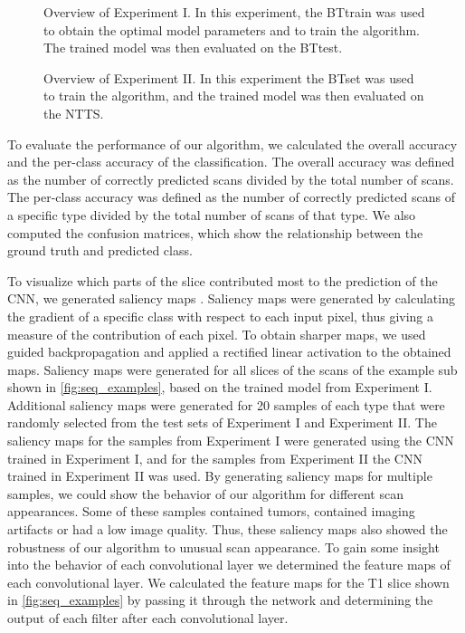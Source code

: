 \newpage
\begin{figure}
\centering
{}
\caption{Overview of Experiment I. In this experiment, the \gls{BTtrain} was used to obtain the optimal model parameters and to train the algorithm. The trained model was then evaluated on the \gls{BTtest}.}
\label{fig:brain_tumor_experiment}
\end{figure}

\begin{figure}
\centering


\caption{Overview of Experiment II. In this experiment the \gls{BTset} was used to train the algorithm, and the trained model was then evaluated on the \gls{NTTS}.}
\label{fig:adni_experiment}
\end{figure}

To evaluate the performance of our algorithm, we calculated the overall accuracy and the per-class accuracy of the classification.
The overall accuracy was defined as the number of correctly predicted \glspl{scan} divided by the total number of \glspl{scan}.
The per-class accuracy was defined as the number of correctly predicted \glspl{scan} of a specific \gls{type} divided by the total number of \glspl{scan} of that \gls{type}.
We also computed the confusion matrices, which show the relationship between the ground truth and predicted \gls{class}.

To visualize which parts of the \gls{slice} contributed most to the prediction of the \gls{CNN}, we generated saliency maps \autocite{simonyan2014deep}.
Saliency maps were generated by calculating the gradient of a specific \gls{class} with respect to each input pixel, thus giving a measure of the contribution of each pixel.
To obtain sharper maps, we used guided backpropagation \autocite{springenberg2015striving} and applied a rectified linear activation to the obtained maps.
Saliency maps were generated for all \glspl{slice} of the \glspl{scan} of the example \gls{sub} shown in \cref{fig:seq_examples}, based on the trained model from Experiment I.
Additional saliency maps were generated for 20 \glspl{sample} of each \gls{type} that were randomly selected from the test sets of Experiment I and Experiment II.
The saliency maps for the \glspl{sample} from Experiment I were generated using the \gls{CNN} trained in Experiment I, and for the \glspl{sample} from Experiment II the \gls{CNN} trained in Experiment II was used.
By generating saliency maps for multiple \glspl{sample}, we could show the behavior of our algorithm for different \gls{scan} appearances.
Some of these \glspl{sample} contained tumors, contained imaging artifacts or had a low image quality.
Thus, these saliency maps also showed the robustness of our algorithm to unusual \gls{scan} appearance.
To gain some insight into the behavior of each convolutional layer we determined the feature maps of each convolutional layer.
We calculated the feature maps for the \gls{T1} \gls{slice} shown in \cref{fig:seq_examples} by passing it through the network and determining the output of each filter after each convolutional layer.


